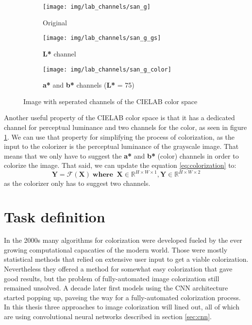 \begin{figure}[!h]
	\centering
	\begin{subfigure}{.3\textwidth}
		\centering
		\texttt{[image: img/lab\_channels/san\_g]}
        \caption{Original}
	\end{subfigure}
	\begin{subfigure}{.3\textwidth}
		\centering
		\texttt{[image: img/lab\_channels/san\_g\_gs]}
        \caption{\textbf{L*} channel}
	\end{subfigure}
	\begin{subfigure}{.3\textwidth}
		\centering
		\texttt{[image: img/lab\_channels/san\_g\_color]}
        \caption{\textbf{a*} and \textbf{b*} channels (\textbf{L*} = 75)}
	\end{subfigure}
    \caption{Image with seperated channels of the CIELAB color space}
	\label{fig:lab_channels}
\end{figure}

Another useful property of the CIELAB color space is that it has a dedicated channel
for perceptual luminance and two channels for the color, as seen in figure \ref{fig:lab_channels}. 
We can use that property for simplifying the process of colorization, as the input to the 
colorizer is the perceptual luminance of the grayscale image. That means that we only have to 
suggest the \textbf{a*} and \textbf{b*} (color) channels in order to colorize the image. 
That said, we can update the equation \ref{eq:colorization} to:
\begin{equation}
    \mathbf{Y} = \mathcal{F}(\mathbf{X})\;\mathbf{where}\;\;\mathbf{X} \in \mathbb{R}^{H \times W \times 1}, \mathbf{Y} \in \mathbb{R}^{H \times W \times 2}\label{eq:colorization_2}
\end{equation}    
as the colorizer only has to suggest two channels.

\section{Task definition}
\label{sec:task}

In the 2000s many algorithms for colorization were developed \citep{levin2004colorization}\citep{luan2007colorization}\citep{charpiat2008colorization}\citep{reinhard2001colorization} 
fueled by the ever growing computational capacaties of the modern world. Those were mostly 
statistical methods that relied on extensive user input to get a viable colorization. 
Nevertheless they offered a method for somewhat easy colorization that gave good results, 
but the problem of fully-automated image colorization still remained unsolved. A decade later 
first models \citep{cheng2015colorization}\citep{iizuka2016colorization} using the CNN
architecture started popping up, paveing the way for a fully-automated colorization process.
In this thesis three approaches to image colorization will lined out, all of which are using 
convolutional neural networks described in section \ref{sec:cnn}.


